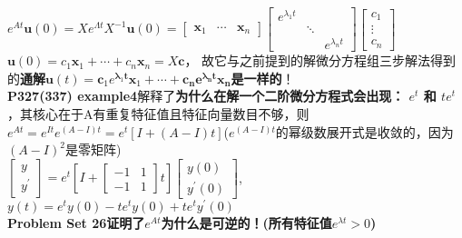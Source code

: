     $e^{A t} \bm{u}(0)=X e^{\Lambda t} X^{-1} \bm{u}(0)=\left[\begin{array}{ccc}{\bm{x}_{1}} & {\cdots} & {\bm{x}_{n}}\end{array}\right]\left[\begin{array}{ccc}{e^{\lambda_{1} t}} & {} & {} \\ {} & {\ddots} & {} \\ {} & {} & {e^{\lambda_{n} t}}\end{array}\right]\left[\begin{array}{c}{c_{1}} \\ {\vdots} \\ {c_{n}}\end{array}\right]$
    \\
    $\boldsymbol{u}(0)=c_{1} \boldsymbol{x}_{1}+\cdots+c_{n} \boldsymbol{x}_{n}=X \boldsymbol{c}$，\quad
    故它与之前提到的解微分方程组三步解法得到的\textbf{通解}$\boldsymbol{u}(t)=\boldsymbol{c}_{1} e^{\boldsymbol{\lambda}_{1} \boldsymbol{t}} \boldsymbol{x}_{1}+\cdots+\boldsymbol{c}_{\boldsymbol{n}} \boldsymbol{e}^{\boldsymbol{\lambda}_{\boldsymbol{n}} \boldsymbol{t}} \boldsymbol{x}_{\boldsymbol{n}}$\textbf{是一样的}！
    \\
    \textbf{{P327(337) example4}}解释了\textbf{为什么在解一个二阶微分方程式会出现： $e^{t}$ 和 $t e^{t}$}，其核心在于A有重复特征值且特征向量数目不够，则$e^{A t}=e^{I t} e^{(A-I) t}=e^{t}[I+(A-I) t]$($e^{(A-I) t}$的幂级数展开式是收敛的，因为$(A-I)^{2}$是零矩阵)\\
    $\left[\begin{array}{l}{y} \\ {y^{\prime}}\end{array}\right]=e^{t}\left[I+\left[\begin{array}{cc}{-1} & {1} \\ {-1} & {1}\end{array}\right] t\right]\left[\begin{array}{c}{y(0)} \\ {y^{\prime}(0)}\end{array}\right]$, $y(t)=e^{t} y(0)-t e^{t} y(0)+t e^{t} y^{\prime}(0)$
    \\
    \textbf{Problem Set 26证明了$e^{At}$为什么是可逆的！(所有特征值$e^{\lambda t}>0$)}\\

